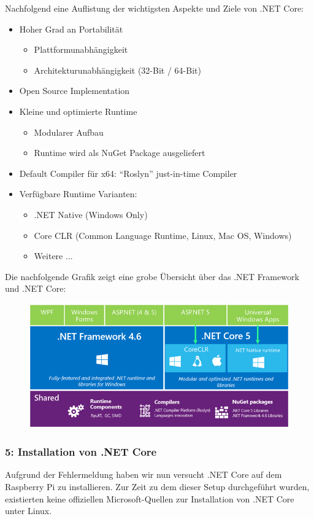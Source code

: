 Nachfolgend eine Auflistung der wichtigsten Aspekte und Ziele von .NET Core:
\begin{itemize}
\item Hoher Grad an Portabilität
\begin{itemize}
\item Plattformunabhängigkeit
\item Architekturunabhängigkeit (32-Bit / 64-Bit)
\end{itemize}
\item Open Source Implementation
\item Kleine und optimierte Runtime
\begin{itemize}
\item Modularer Aufbau
\item Runtime wird als NuGet Package ausgeliefert
\end{itemize}
\item Default Compiler für x64: "`Roslyn"' just-in-time Compiler
\item Verfügbare Runtime Varianten: 
\begin{itemize}
\item .NET Native (Windows Only)
\item Core CLR (Common Language Runtime, Linux, Mac OS, Windows)
\item Weitere ...
\end{itemize}
\end{itemize}

Die nachfolgende Grafik zeigt eine grobe Übersicht über das .NET Framework und .NET Core:
\begin{figure}[H]
  \centering
  \includegraphics[width=15cm]{./images/UnderstandingNetCore}
\end{figure}


\subsubsection{5: Installation von .NET Core}
Aufgrund der Fehlermeldung haben wir nun versucht .NET Core auf dem Raspberry Pi zu installieren. Zur Zeit zu dem dieser Setup durchgeführt wurden, existierten keine offiziellen Microsoft-Quellen zur Installation von .NET Core unter Linux.

